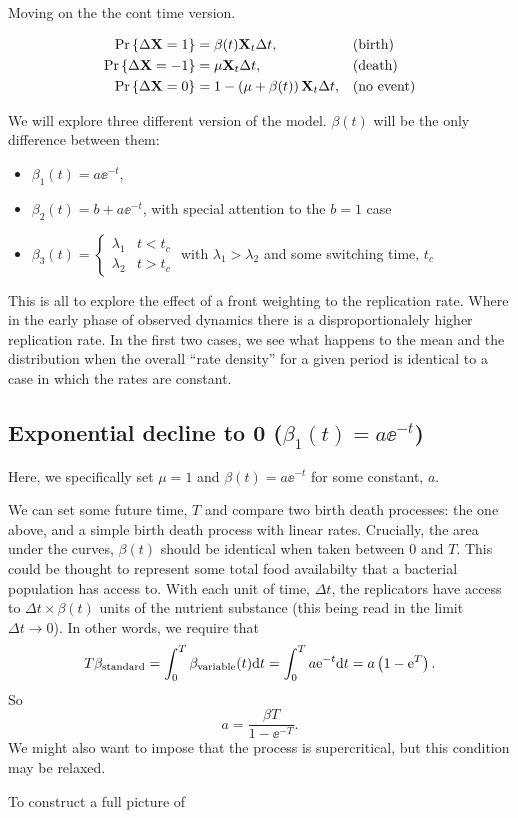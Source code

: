 



Moving on the the cont time version. 


\begin{align*}
     {\text{Pr}\left\{\Delta{\bf X}= 1\right\}} &=  \beta(t){{\bf X}_t} \Delta t,  &&\text{(birth)}\\
      {\text{Pr}\left\{\Delta{\bf X}= -1\right\}} &= \mu {{\bf X}_t}\Delta t,  &&\text{(death)}\\
     {\text{Pr}\left\{\Delta{\bf X}= 0\right\}} &= 1 -  \left(  \mu + \beta(t)\right){{\bf X}_t}\Delta t,  &&\text{(no event)}
\end{align*} 



We will explore three different version of the model. $\beta(t)$ will be the only difference between them:

\begin{itemize}
\item $\beta_1(t) = a \ee^{-t}$,
\item $\beta_2(t) = b + a \ee^{-t}$, with special attention to the $b=1$ case
\item $\beta_3(t) = \begin{cases}
\lambda_1 &  t< t_c\\
\lambda_2 & t > t_c
\end{cases}
$  with $\lambda_1 > \lambda_2$ and some switching time, $t_c$
\end{itemize}


This is all to explore the effect of a front weighting to the replication rate. Where in the early phase of observed dynamics there is a disproportionalely higher replication rate. In the first two cases, we see what happens to the mean and the distribution when the overall ``rate density'' for a given period is identical to a case in which the rates are constant.

\subsection{Exponential decline to 0 ($\beta_1(t) = a\ee^{-t}$)}


Here, we specifically set $\mu = 1$ and $\beta(t) = a \ee^{-t}$ for some constant, $a$.

We can set some future time, $T$ and compare two birth death processes: the one above, and a simple birth death process with linear rates. Crucially, the area under the curves, $\beta(t)$ should be identical when taken between 0 and $T$. This could be thought to represent some total food availabilty that a bacterial population has access to. With each unit of time, $\Delta t$, the replicators have access to $\Delta t \times \beta(t)$ units of the nutrient substance (this being read in the limit $\Delta t \to 0$).  In other words, we require that
$$T\beta_{\text{standard}} = \int_0^T \beta_{\text{variable}}(t) {\rm d} t = \int^T_0 a {\rm e}^{-t}{\rm d} t = a\left(1 - {\rm e}^T\right).$$ 
So 
$$a = \frac{\beta T }{1 - \ee^{-T}}.$$
We might also want to impose that the process is supercritical, but this condition may be relaxed.\par 
To construct a full picture of 

